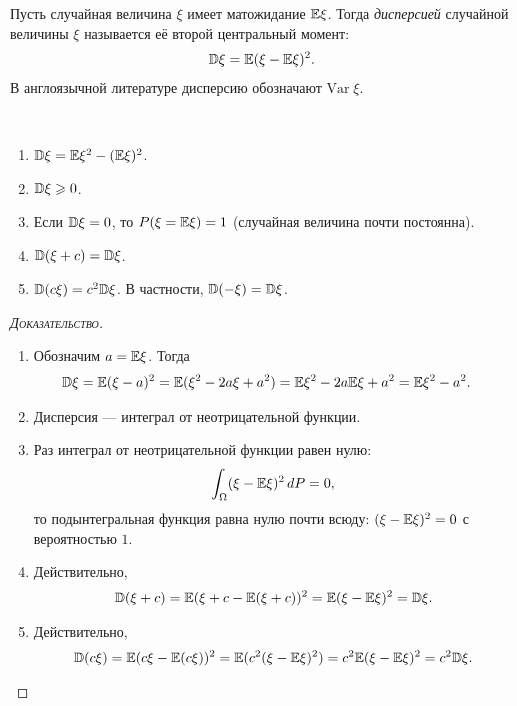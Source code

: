 \documentclass[../main.tex]{subfiles}
\begin{document}
\begin{df}[дисперсия]
 Пусть случайная величина $ \xi $ имеет матожидание $ \mathbb E\xi $. Тогда \textit{дисперсией} случайной величины $ \xi $ называется её второй центральный момент:
 \begin{align*}
  \mathbb D \xi = \mathbb E (\xi - \mathbb E\xi)^{2}.
 \end{align*}
 В англоязычной литературе дисперсию обозначают $ \mathrm{Var} \;\xi $.
\end{df}
\begin{prop}\
 \begin{enumerate}
  \item $ \mathbb D\xi = \mathbb E\xi^{2} - (\mathbb E\xi)^{2} $.
  \item $ \mathbb D\xi \geqslant 0 $.
  \item Если $ \mathbb D\xi = 0 $, то $ P(\xi = \mathbb E\xi) = 1 $ (случайная величина почти постоянна).
  \item \label{enum:variance_plus_const} $ \mathbb D(\xi + c) = \mathbb D\xi $.
  \item \label{enum:variance_times_const} $ \mathbb D(c\xi) = c^{2}\mathbb D\xi $. В частности, $ \mathbb D(-\xi) = \mathbb D\xi $.
 \end{enumerate}
\end{prop}
\begin{proof}[\normalfont\textsc{Доказательство}]\
 \begin{enumerate}
  \item Обозначим $ a = \mathbb E\xi $. Тогда
   \begin{align*}
    \mathbb D\xi &= \mathbb E(\xi - a)^{2} = \mathbb E(\xi^{2} - 2a\xi + a^{2}) = \mathbb E\xi^{2} - 2a\mathbb E\xi + a^{2} = \mathbb E\xi^{2} - a^{2}.
   \end{align*}
  \item Дисперсия --- интеграл от неотрицательной функции.
  \item Раз интеграл от неотрицательной функции равен нулю:
   \begin{align*}
    \int_{\Omega} (\xi-\mathbb E\xi)^{2} \,dP = 0,
   \end{align*} то подынтегральная функция равна нулю почти всюду: $ (\xi - \mathbb E\xi)^{2} = 0 $ с вероятностью $ 1 $.
  \item Действительно,
   \begin{align*}
    \mathbb D(\xi + c) = \mathbb E(\xi + c - \mathbb E(\xi + c))^{2} = \mathbb E(\xi - \mathbb E\xi)^{2} = \mathbb D\xi.
   \end{align*}
  \item Действительно,
   \begin{align*}
    \mathbb D(c\xi) = \mathbb E(c\xi - \mathbb E(c\xi))^{2} = \mathbb E (c^{2}(\xi - \mathbb E\xi)^{2}) = c^{2}\mathbb E(\xi-\mathbb E\xi)^{2} = c^{2}\mathbb D\xi.
   \end{align*}
 \end{enumerate}
\end{proof}
\end{document}
